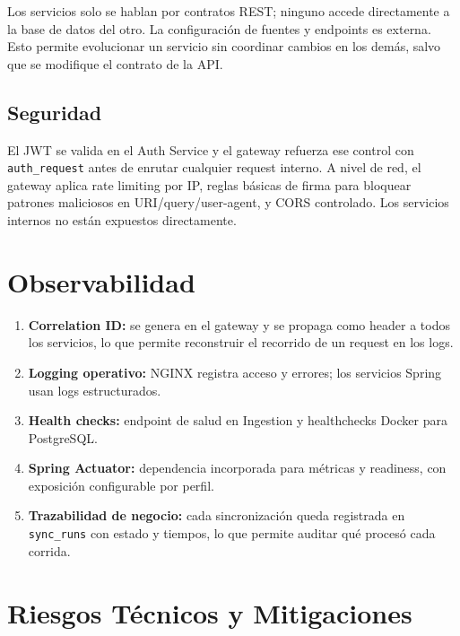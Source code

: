 \documentclass[12pt,a4paper]{article}
\begin{document}
Los servicios solo se hablan por contratos REST; ninguno accede directamente a la base de datos del otro. La configuración de fuentes y endpoints es externa. Esto permite evolucionar un servicio sin coordinar cambios en los demás, salvo que se modifique el contrato de la API.

\subsection{Seguridad}

El JWT se valida en el Auth Service y el gateway refuerza ese control con \texttt{auth\_request} antes de enrutar cualquier request interno. A nivel de red, el gateway aplica rate limiting por IP, reglas básicas de firma para bloquear patrones maliciosos en URI/query/user-agent, y CORS controlado. Los servicios internos no están expuestos directamente.

\section{Observabilidad}

\begin{enumerate}[leftmargin=1.2cm]
  \item \textbf{Correlation ID:} se genera en el gateway y se propaga como header a todos los servicios, lo que permite reconstruir el recorrido de un request en los logs.
  \item \textbf{Logging operativo:} NGINX registra acceso y errores; los servicios Spring usan logs estructurados.
  \item \textbf{Health checks:} endpoint de salud en Ingestion y healthchecks Docker para PostgreSQL.
  \item \textbf{Spring Actuator:} dependencia incorporada para métricas y readiness, con exposición configurable por perfil.
  \item \textbf{Trazabilidad de negocio:} cada sincronización queda registrada en \texttt{sync\_runs} con estado y tiempos, lo que permite auditar qué procesó cada corrida.
\end{enumerate}

\section{Riesgos Técnicos y Mitigaciones}
\end{document}
